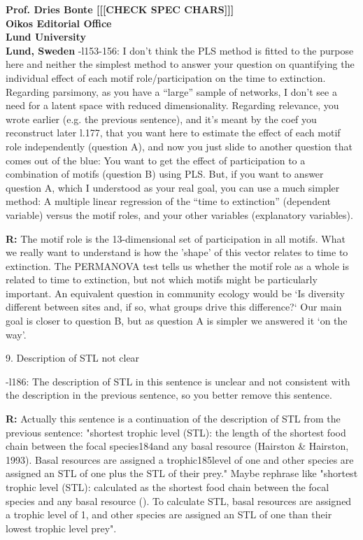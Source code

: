 \documentclass[12pt]{letter}
\begin{document}
\begin{letter}{\bf Prof. Dries Bonte [[[CHECK SPEC CHARS]]]\\
Oikos Editorial Office \\
Lund University \\
Lund, Sweden}
      -l153-156:  I don’t think the PLS method is fitted to the purpose here and neither the simplest method to answer your question on quantifying the individual effect of each motif role/participation on the time to extinction. Regarding parsimony, as you have a “large” sample of networks, I don’t see a need for a latent space with reduced dimensionality. Regarding relevance, you wrote earlier (e.g. the previous sentence), and it’s meant by the coef you reconstruct later l.177, that you want here to estimate the effect of each motif role independently (question A), and now you just slide to another question that comes out of the blue: You want to get the effect of participation to a combination of motifs (question B) using PLS. But, if you want to answer question A, which I understood as your real goal, you can use a much simpler method: A multiple linear regression of the “time to extinction” (dependent variable) versus the motif roles, and your other variables (explanatory variables).

      \textbf{R:}
      The motif role is the 13-dimensional set of participation in all motifs. What we really want to understand is how the 'shape' of this vector relates to time to extinction. The PERMANOVA test tells us whether the motif role as a whole is related to time to extinction, but not which motifs might be particularly important. An equivalent question in community ecology would be `Is diversity different between sites and, if so, what groups drive this difference?` Our main goal is closer to question B, but as question A is simpler we answered it `on the way'.



    9. Description of STL not clear

      -l186: The description of STL in this sentence is unclear and not consistent with the description in the previous sentence, so you better remove this sentence.

      \textbf{R:}
      Actually this sentence is a continuation of the description of STL from the previous sentence: "shortest trophic level (STL): the length of the shortest food chain between the focal species184and any basal resource (Hairston & Hairston, 1993). Basal resources are assigned a trophic185level of one and other species are assigned an STL of one plus the STL of their prey." Maybe rephrase like "shortest trophic level (STL): calculated as the shortest food chain between the focal species and any basal resource (). To calculate STL, basal resources are assigned a trophic level of 1, and other species are assigned an STL of one than their lowest trophic level prey".



\end{letter}
\end{document}
